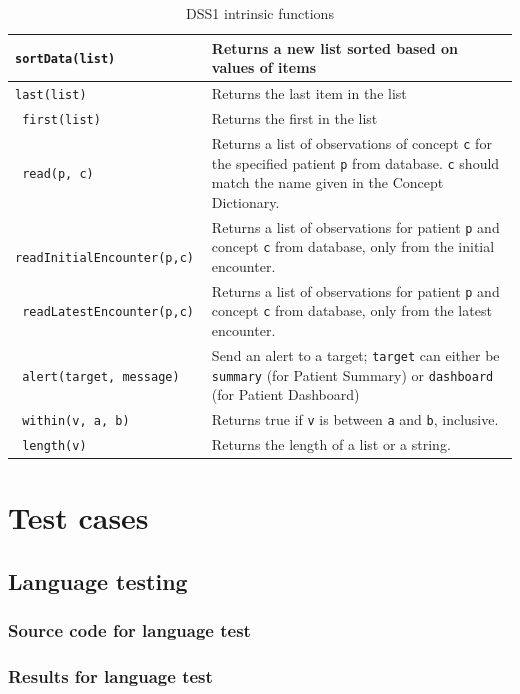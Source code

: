 \documentclass[12pt,letterpaper]{article}
\begin{document}
{\begin{table}
\begin{centering}
\begin{tabular}{ | >{\tt}l | p{3.66in} | }
sortData(list) &
Returns a new list sorted based on values of items  \\ \hline
last(list) &
Returns the last item in the list \\ \hline
first(list) &
Returns the first in the list \\ \hline
\hline
read(p, c) &
Returns a list of observations of concept \texttt{c} for the specified patient \texttt{p} from database. \newline
\texttt{c} should match the name given in the Concept Dictionary. 
\\ \hline
readInitialEncounter(p,c) &
Returns a list of observations for patient \texttt{p} and concept 
\texttt{c} from database, only from the initial encounter.
\\ \hline
readLatestEncounter(p,c) &
Returns a list of observations for patient \texttt{p} and concept 
\texttt{c} from database, only from the latest encounter.
\\ \hline \hline
alert(target, message) &
Send an alert to a target;
\texttt{target} can either be \texttt{summary} (for Patient Summary) or \texttt{dashboard} (for Patient Dashboard)
\\ \hline
within(v, a, b) &
Returns true if \texttt{v} is between \texttt{a} and \texttt{b}, inclusive.
\\ \hline
length(v) &
Returns the length of a list or a string. \\ \hline
\end{tabular}


\end{centering}
\caption{DSS1 intrinsic functions} \label{tab:INTRINSIC_FUNCTION_LIST}
\end{table}

\newpage
\section{Test cases} \label{sec:TEST_CASES}

\subsection{Language testing} \label{sec:TEST_CASES_LANGUAGE}

\subsubsection{Source code for language test}


\subsubsection{Results for language test}
\begin{footnotesize}

\end{footnotesize}

}
\end{document}
